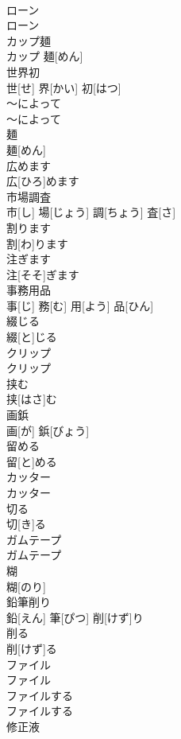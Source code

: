 \documentclass[8pt]{extreport}
\begin{document}
\begin{CJK}{UTF8}{min}
\\	ローン	
\\	ローン		
\\	カップ麺	
\\	カップ 麺[めん]		
\\	世界初	
\\	世[せ] 界[かい] 初[はつ]		
\\	～によって	
\\	～によって		
\\	麺	
\\	麺[めん]		
\\	広めます	
\\	広[ひろ]めます		
\\	市場調査	
\\	市[し] 場[じょう] 調[ちょう] 査[さ]		
\\	割ります	
\\	割[わ]ります		
\\	注ぎます	
\\	注[そそ]ぎます		
\\	事務用品	
\\	事[じ] 務[む] 用[よう] 品[ひん]		
\\	綴じる	
\\	綴[と]じる		
\\	クリップ	
\\	クリップ		
\\	挟む	
\\	挟[はさ]む		
\\	画鋲	
\\	画[が] 鋲[びょう]		
\\	留める	
\\	留[と]める		
\\	カッター	
\\	カッター		
\\	切る	
\\	切[き]る		
\\	ガムテープ	
\\	ガムテープ		
\\	糊	
\\	糊[のり]		
\\	鉛筆削り	
\\	鉛[えん] 筆[ぴつ] 削[けず]り		
\\	削る	
\\	削[けず]る		
\\	ファイル	
\\	ファイル		
\\	ファイルする	
\\	ファイルする		
\\	修正液	

\end{CJK}
\end{document}
